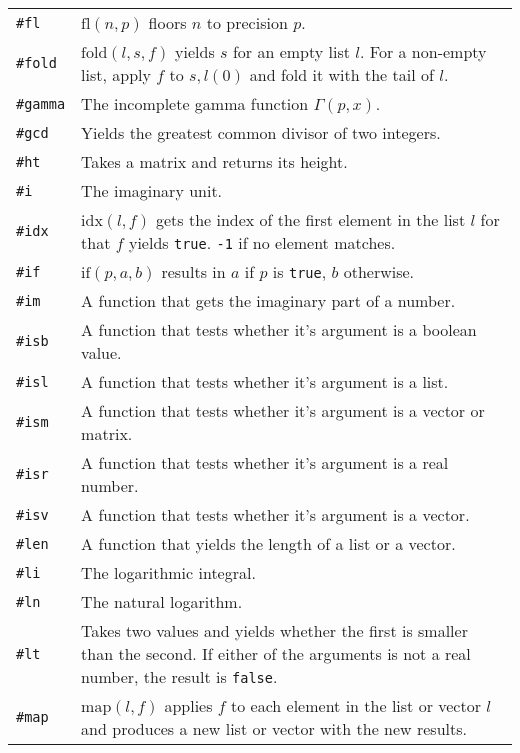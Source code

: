 \documentclass[10pt]{article}
\begin{document}
\begin{longtable}{p{}p{}}
        \verb|#fl|     & $ \mathrm{fl}(n,p) $ floors $ n $ to precision $ p $. \\
        \verb|#fold|   & $ \mathrm{fold}(l,s,f) $ yields $ s $ for an empty list $ l $.
                         For a non-empty list, apply $ f $ to $ s, l(0) $ and fold it with the tail of $ l $. \\
        \verb|#gamma|  & The incomplete gamma function $ \Gamma(p, x) $. \\
        \verb|#gcd|    & Yields the greatest common divisor of two integers. \\
        \verb|#ht|     & Takes a matrix and returns its height. \\
        \verb|#i|      & The imaginary unit. \\
        \verb|#idx|    & $ \mathrm{idx}(l,f) $ gets the index of the first element in the list $ l $ for that $ f $ yields \verb|true|.
                         \verb|-1| if no element matches. \\
        \verb|#if|     & $ \mathrm{if}(p,a,b) $ results in $ a $ if $ p $ is \verb|true|, $ b $ otherwise. \\
        \verb|#im|     & A function that gets the imaginary part of a number. \\
        \verb|#isb|    & A function that tests whether it's argument is a boolean value. \\
        \verb|#isl|    & A function that tests whether it's argument is a list. \\
        \verb|#ism|    & A function that tests whether it's argument is a vector or matrix. \\
        \verb|#isr|    & A function that tests whether it's argument is a real number. \\
        \verb|#isv|    & A function that tests whether it's argument is a vector. \\
        \verb|#len|    & A function that yields the length of a list or a vector. \\
        \verb|#li|     & The logarithmic integral. \\
        \verb|#ln|     & The natural logarithm. \\
        \verb|#lt|     & Takes two values and yields whether the first is smaller than the second.
                         If either of the arguments is not a real number, the result is \verb|false|. \\
        \verb|#map|    & $ \mathrm{map}(l,f) $ applies $ f $ to each element in the list or vector  $ l $ and produces a new list or vector with the new results. \\

\end{longtable}
\end{document}

